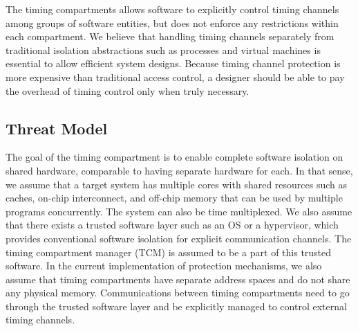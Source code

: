 
The timing compartments allows software to explicitly control timing channels
among groups of software entities, but does not enforce any restrictions within
each compartment. We believe that handling timing channels separately from
traditional isolation abstractions such as processes and virtual machines is essential
to allow efficient system designs. Because timing channel protection is more expensive
than traditional access control, a designer should be able to pay the overhead
of timing control only when truly necessary.


\subsection{Threat Model}

The goal of the timing compartment is to enable complete software isolation
on shared hardware, comparable to having separate hardware for each.
In that sense, we assume that a target system has multiple cores with shared
resources such as caches, on-chip interconnect, and off-chip memory that can
be used by multiple programs concurrently. The system can also be time multiplexed.
We also assume that there exists a trusted software layer such as an OS or a hypervisor,
which provides conventional software isolation for explicit communication channels.
The timing compartment manager (TCM) is assumed to be a part of this trusted software.
In the current implementation of protection mechanisms, we also assume that
timing compartments have separate address spaces and do not share any physical
memory. Communications between timing compartments need to go through the trusted
software layer and be explicitly managed to control external timing channels. 

